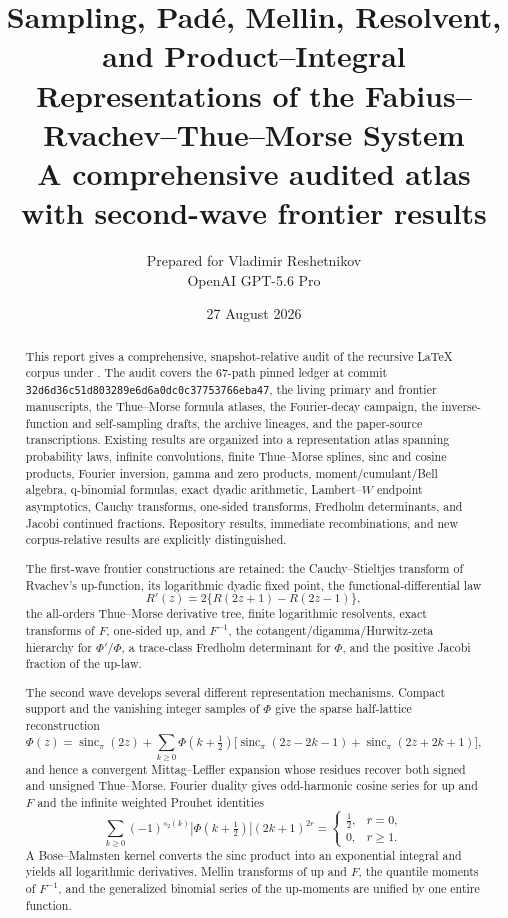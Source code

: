 \documentclass[11pt]{article}
\title{\textbf{Sampling, Pad\'e, Mellin, Resolvent, and Product--Integral\\
       Representations of the Fabius--Rvachev--Thue--Morse System}\\[5pt]
       \large A comprehensive audited atlas with second-wave frontier results}
\author{Prepared for Vladimir Reshetnikov\\
        OpenAI GPT-5.6 Pro}
\date{27 August 2026}
\theoremstyle{definition}
\theoremstyle{remark}
\begin{document}
\maketitle

\begin{abstract}
This report gives a comprehensive, snapshot-relative audit of the recursive LaTeX corpus
under .  The audit covers the 67-path pinned ledger at
commit \texttt{32d6d36c51d803289e6d6a0dc0c37753766eba47}, the living primary and
frontier manuscripts, the Thue--Morse formula atlases, the Fourier-decay campaign, the
inverse-function and self-sampling drafts, the archive lineages, and the paper-source
transcriptions.  Existing results are organized into a representation atlas spanning
probability laws, infinite convolutions, finite Thue--Morse splines, sinc and cosine
products, Fourier inversion, gamma and zero products, moment/cumulant/Bell algebra,
q-binomial formulas, exact dyadic arithmetic, Lambert--\(W\) endpoint asymptotics,
Cauchy transforms, one-sided transforms, Fredholm determinants, and Jacobi continued
fractions.  Repository results, immediate recombinations, and new corpus-relative results
are explicitly distinguished.

The first-wave frontier constructions are retained: the Cauchy--Stieltjes transform of
Rvachev's up-function, its logarithmic dyadic fixed point, the functional-differential law
\[
 R'(z)=2\{R(2z+1)-R(2z-1)\},
\]
the all-orders Thue--Morse derivative tree, finite logarithmic resolvents, exact transforms
of \(F\), one-sided up, and \(F^{-1}\), the cotangent/digamma/Hurwitz-zeta hierarchy for
\(\Phi'/\Phi\), a trace-class Fredholm determinant for \(\Phi\), and the positive Jacobi
fraction of the up-law.

The second wave develops several different representation mechanisms.  Compact support
and the vanishing integer samples of \(\Phi\) give the sparse half-lattice reconstruction
\[
 \Phi(z)=\operatorname{sinc}_{\pi}(2z)+
 \sum_{k\ge0}\Phi(k+\tfrac12)
 \bigl[\operatorname{sinc}_{\pi}(2z-2k-1)+
       \operatorname{sinc}_{\pi}(2z+2k+1)\bigr],
\]
and hence a convergent Mittag--Leffler expansion whose residues recover both signed and
unsigned Thue--Morse.  Fourier duality gives odd-harmonic cosine series for up and \(F\)
and the infinite weighted Prouhet identities
\[
 \sum_{k\ge0}(-1)^{s_2(k)}|\Phi(k+\tfrac12)|(2k+1)^{2r}
 =\begin{cases}\tfrac12,&r=0,\\0,&r\ge1.\end{cases}
\]
A Bose--Malmsten kernel converts the sinc product into an exponential integral and yields
all logarithmic derivatives.  Mellin transforms of up and \(F\), the quantile moments of
\(F^{-1}\), and the generalized binomial series of the up-moments are unified by one
entire function.


\end{abstract}
\end{document}
